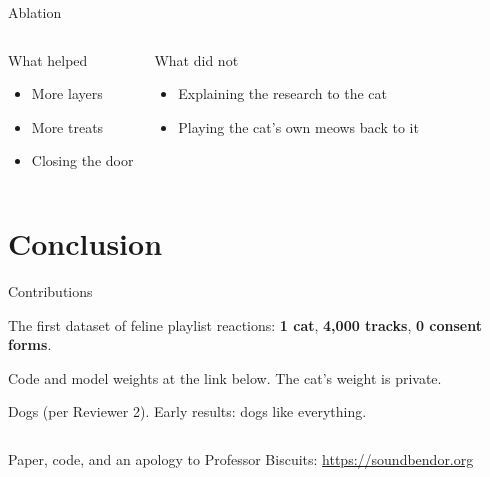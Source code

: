 \documentclass[10pt,aspectratio=169,xcolor=table]{beamer}
\begin{document}
{
\begin{frame}{Ablation}
  \begin{columns}[T]
      \begin{exampleblock}{What helped}
        \begin{itemize}
          \item More layers
          \item More treats
          \item Closing the door
        \end{itemize}
      \end{exampleblock}
      \begin{alertblock}{What did not}
        \begin{itemize}
          \item Explaining the research to the cat
          \item Playing the cat's own meows back to it
        \end{itemize}
      \end{alertblock}
  \end{columns}
\end{frame}
}

\section{Conclusion}

\begin{frame}{Contributions}
  \begin{contribution}
    The first dataset of feline playlist reactions: \textbf{1 cat},
    \textbf{4{,}000 tracks}, \textbf{0 consent forms}.
  \end{contribution}
  \begin{contribution}
    Code and model weights at the link below. The cat's weight is private.
  \end{contribution}
  \begin{futurework}
    Dogs (per Reviewer 2). Early results: dogs like everything.
  \end{futurework}
  \vfill
  \begin{columns}[c]
    \small Paper, code, and an apology to Professor Biscuits:
      \url{https://soundbendor.org}
  \end{columns}
\end{frame}
\end{document}
